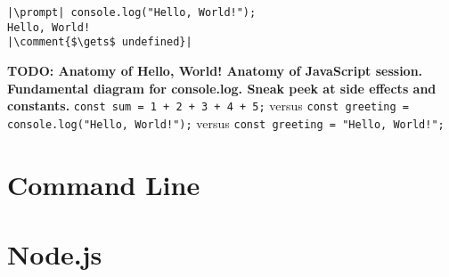 \reactivatelinenumbers
\begin{lstlisting}[caption={\label{listing:intro-console} A session in the JavaScript console of a web browser.}, escapeinside=||]
|\prompt| console.log("Hello, World!");
Hello, World!
|\comment{$\gets$ undefined}|
\end{lstlisting}

\textbf{TODO: Anatomy of Hello, World! Anatomy of JavaScript session. Fundamental diagram for console.log. Sneak peek at side effects and constants.} \texttt{const sum = 1 + 2 + 3 + 4 + 5;} versus \texttt{const greeting = console.log("Hello, World!");} versus \texttt{const greeting = "Hello, World!";}


\section{Command Line}

\section{Node.js}
